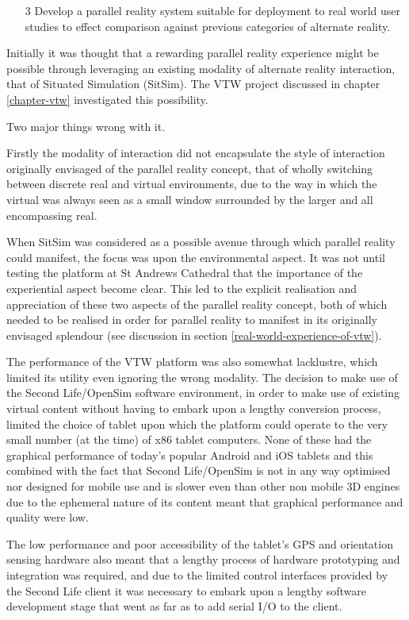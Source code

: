 \begin{enumerate}
	\item[3] Develop a parallel reality system suitable for deployment to real world user studies to effect comparison against previous categories of alternate reality.
\end{enumerate}

Initially it was thought that a rewarding parallel reality experience might be possible through leveraging an existing modality of alternate reality interaction, that of Situated Simulation (SitSim). The VTW project discussed in chapter \ref{chapter-vtw} investigated this possibility.

Two major things wrong with it.

Firstly the modality of interaction did not encapsulate the style of interaction originally envisaged of the parallel reality concept, that of wholly switching between discrete real and virtual environments, due to the way in which the virtual was always seen as a small window surrounded by the larger and all encompassing real.

When SitSim was considered as a possible avenue through which parallel reality could manifest, the focus was upon the environmental aspect. It was not until testing the platform at St Andrews Cathedral that the importance of the experiential aspect become clear. This led to the explicit realisation and appreciation of these two aspects of the parallel reality concept, both of which needed to be realised in order for parallel reality to manifest in its originally envisaged splendour (see discussion in section \ref{real-world-experience-of-vtw}).

The performance of the VTW platform was also somewhat lacklustre, which limited its utility even ignoring the wrong modality. The decision to make use of the Second Life/OpenSim software environment, in order to make use of existing virtual content without having to embark upon a lengthy conversion process, limited the choice of tablet upon which the platform could operate to the very small number (at the time) of x86 tablet computers. None of these had the graphical performance of today's popular Android and iOS tablets and this combined with the fact that Second Life/OpenSim is not in any way optimised nor designed for mobile use and is slower even than other non mobile 3D engines due to the ephemeral nature of its content meant that graphical performance and quality were low.

The low performance and poor accessibility of the tablet's GPS and orientation sensing hardware also meant that a lengthy process of hardware prototyping and integration was required, and due to the limited control interfaces provided by the Second Life client it was necessary to embark upon a lengthy software development stage that went as far as to add serial I/O to the client.


